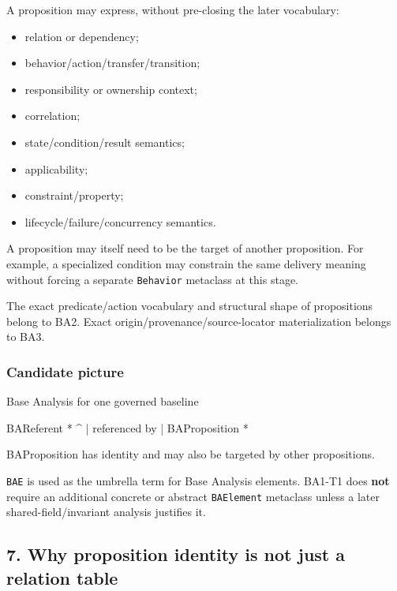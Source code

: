 \documentclass[
]{article}
\newenvironment{Shaded}{}{}
\newcommand{\NormalTok}[1]{#1}
\providecommand{\tightlist}{%
  \setlength{\itemsep}{0pt}\setlength{\parskip}{0pt}}
\begin{document}
A proposition may express, without pre-closing the later vocabulary:

\begin{itemize}
\tightlist
\item
  relation or dependency;
\item
  behavior/action/transfer/transition;
\item
  responsibility or ownership context;
\item
  correlation;
\item
  state/condition/result semantics;
\item
  applicability;
\item
  constraint/property;
\item
  lifecycle/failure/concurrency semantics.
\end{itemize}

A proposition may itself need to be the target of another proposition.
For example, a specialized condition may constrain the same delivery
meaning without forcing a separate \texttt{Behavior} metaclass at this
stage.

The exact predicate/action vocabulary and structural shape of
propositions belong to BA2. Exact origin/provenance/source-locator
materialization belongs to BA3.

\subsubsection{Candidate picture}\label{candidate-picture}

\begin{Shaded}
\begin{Highlighting}[]
\NormalTok{Base Analysis for one governed baseline}

\NormalTok{    BAReferent *}
\NormalTok{        \^{}}
\NormalTok{        | referenced by}
\NormalTok{        |}
\NormalTok{    BAProposition *}

\NormalTok{BAProposition has identity and may also be targeted by other propositions.}
\end{Highlighting}
\end{Shaded}

\texttt{BAE} is used as the umbrella term for Base Analysis elements.
BA1-T1 does \textbf{not} require an additional concrete or abstract
\texttt{BAElement} metaclass unless a later shared-field/invariant
analysis justifies it.

\subsection{7. Why proposition identity is not just a relation
table}\label{7-why-proposition-identity-is-not-just-a-relation-table}
\end{document}
